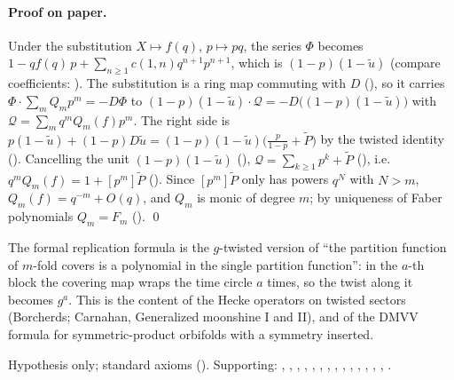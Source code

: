 \paragraph{Proof on paper.}  Under the substitution $X\mapsto f(q)$, $p\mapsto pq$, the series $\Phi$ becomes
$1-qf(q)\,p+\sum_{n\ge1}c(1,n)q^{n+1}p^{n+1}$, which is $(1-p)(1-\tilde u)$ (compare coefficients:
).  The substitution is a ring map commuting with $D$
(), so it carries $\Phi\cdot\sum_mQ_mp^m=-D\Phi$ to
$(1-p)(1-\tilde u)\cdot\mathcal Q=-D\bigl((1-p)(1-\tilde u)\bigr)$ with $\mathcal Q=\sum_mq^mQ_m(f)p^m$.  The right side is
$p(1-\tilde u)+(1-p)D\tilde u=(1-p)(1-\tilde u)\bigl(\frac p{1-p}+\tilde P\bigr)$ by the twisted identity
().  Cancelling the unit $(1-p)(1-\tilde u)$ (),
$\mathcal Q=\sum_{k\ge1}p^k+\tilde P$ (), i.e.\ $q^mQ_m(f)=1+[p^m]\tilde P$
().  Since $[p^m]\tilde P$ only has powers $q^N$ with $N>m$, $Q_m(f)=q^{-m}+O(q)$, and
$Q_m$ is monic of degree $m$; by uniqueness of Faber polynomials $Q_m=F_m$ ().
\qed
\begin{physics}
The formal replication formula is the $g$-twisted version of ``the partition function of $m$-fold covers is a polynomial
in the single partition function'': in the $a$-th block the covering map wraps the time circle $a$ times, so the twist
along it becomes $g^a$.  This is the content of the Hecke operators on twisted sectors (Borcherds; Carnahan,
Generalized moonshine I and II), and of the DMVV formula for symmetric-product orbifolds with a symmetry inserted.
\end{physics}
\begin{status}Hypothesis  only; standard axioms ().
Supporting: , ,
, , ,
, , , ,
, , ,
, , .\end{status}

